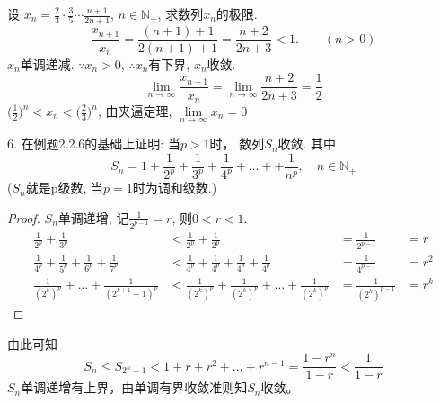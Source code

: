 设 $ x_n = \frac{2}{3}\cdot \frac{3}{5}\cdots\frac{n+1}{2n+1} $, $ n\in\mathbb{N}_+ $, 求数列{$ x_n $}的极限.
\begin{equation}\label{2.3.2-4-001}
	\frac{x_{n+1}}{x_n} = \frac{(n+1)+1}{2(n+1)+1} = \frac{n+2}{2n+3} < 1.\qquad (n>0)
\end{equation}
{$ x_n $}单调递减. $ \because x_n>0 $, $ \therefore  ${$ x_n $}有下界, {$ x_n $}收敛.\\
\begin{equation*}
	\lim_{n\rightarrow\infty}\frac{x_{n+1}}{x_n} = \lim_{n\rightarrow\infty} \frac{n+2}{2n+3}  =\frac{1}{2}
\end{equation*}
$ \Big(\frac{1}{2}\Big)^n < x_n < \Big(\frac{2}{3}\Big)^n $, 由夹逼定理, $ \lim\limits_{n\rightarrow\infty} x_n = 0 $

6. 在例题2.2.6的基础上证明: 当$ p>1 $时， 数列{$ S_n $}收敛. 其中
\begin{equation*}
	S_n=1+\frac{1}{2^p}+\frac{1}{3^p}+\frac{1}{4^p}+\dots++\frac{1}{n^p}, \quad n\in\mathbb{N}_+
\end{equation*}
($ S_n $就是p级数, 当$ p=1 $时为调和级数.)
\begin{proof}
	{$ S_n $}单调递增, 记$ \frac{1}{2^{p-1}}  = r$, 则$ 0<r<1 $.
	\begin{align*}
		\frac{1}{2^p}+\frac{1}{3^p}&<\frac{1}{2^p}+\frac{1}{2^p} &= \frac{1}{2^{p-1}}&=r\\
		\frac{1}{4^p}+\frac{1}{5^p}+\frac{1}{6^p}+\frac{1}{7^p}&<\frac{1}{4^p}+\frac{1}{4^p}+\frac{1}{4^p}+\frac{1}{4^p} &= \frac{1}{4^{p-1}}&=r^2\\
		\frac{1}{(2^k)^p}+\dots+\frac{1}{(2^{k+1}-1)^p}&<\frac{1}{(2^k)^p}+\frac{1}{(2^k)^p}+\dots+\frac{1}{(2^k)^p} &= \frac{1}{(2^k)^{p-1}}&=r^k
	\end{align*}
\end{proof}
由此可知
\begin{equation*}
	S_n\leqslant S_{2^n-1} <1+r+r^2+\dots+r^{n-1} = \frac{1-r^n}{1-r}<\frac{1}{1-r}
\end{equation*}
{$ {S_n} $}单调递增有上界，由单调有界收敛准则知{$ S_n $}收敛。

